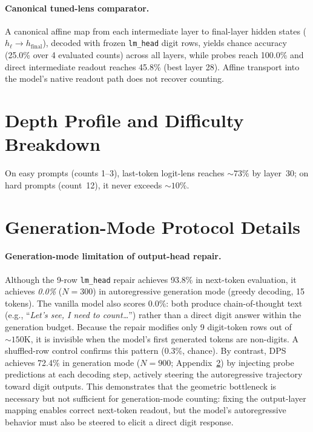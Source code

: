 \documentclass{article}
\begin{document}
\paragraph{Canonical tuned-lens comparator.}
A canonical affine map from each intermediate layer to final-layer hidden states
($h_\ell \rightarrow h_{\mathrm{final}}$), decoded with frozen \texttt{lm\_head} digit rows,
yields chance accuracy (25.0\% over 4 evaluated counts) across all layers,
while probes reach 100.0\% and direct intermediate readout reaches 45.8\% (best layer 28).
Affine transport into the model's native readout path does not recover counting.

\section{Depth Profile and Difficulty Breakdown}
\label{sec:depth_difficulty}

On easy prompts (counts 1--3), last-token logit-lens reaches ${\sim}73\%$ by layer~30;
on hard prompts (count~12), it never exceeds ${\sim}10\%$.

\section{Generation-Mode Protocol Details}
\label{sec:genmode_details}

\paragraph{Generation-mode limitation of output-head repair.}
Although the 9-row \texttt{lm\_head} repair achieves 93.8\% in next-token
evaluation, it achieves \emph{0.0\%} ($N{=}300$) in autoregressive generation
mode (greedy decoding, 15 tokens).  The vanilla model also scores 0.0\%: both
produce chain-of-thought text (e.g., ``\textit{Let's see, I need to
count\ldots}'') rather than a direct digit answer within the generation budget.
Because the repair modifies only 9 digit-token rows out of ${\sim}150$K, it is
invisible when the model's first generated tokens are non-digits.  A
shuffled-row control confirms this pattern (0.3\%, chance).  By contrast, DPS
achieves 72.4\% in generation mode ($N{=}900$; Appendix~\ref{sec:genmode_details})
by injecting probe predictions at each decoding step, actively steering the
autoregressive trajectory toward digit outputs.  This demonstrates that the
geometric bottleneck is necessary but not sufficient for generation-mode
counting: fixing the output-layer mapping enables correct next-token readout,
but the model's autoregressive behavior must also be steered to elicit a direct
digit response.
\end{document}
